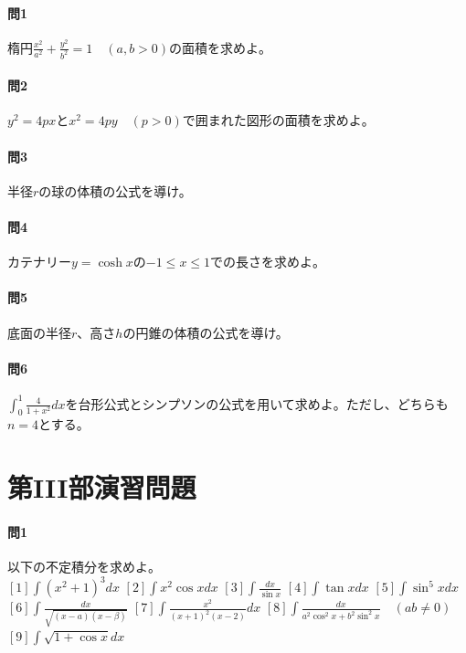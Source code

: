 \documentclass[a4j,dvipdfmx]{jsarticle}
\begin{document}
                \paragraph{問1}楕円$\displaystyle\frac{x^2}{a^2}+\frac{y^2}{b^2}=1\quad (a,b>0)$の面積を求めよ。

                \paragraph{問2}$y^2=4px$と$x^2=4py\quad (p>0)$で囲まれた図形の面積を求めよ。

                \paragraph{問3}半径$r$の球の体積の公式を導け。

                \paragraph{問4}カテナリー$y=\cosh x$の$-1\leq x\leq 1$での長さを求めよ。

                \paragraph{問5}底面の半径$r$、高さ$h$の円錐の体積の公式を導け。

                \paragraph{問6}$\displaystyle \int _0^1 \frac{4}{1+x^2}dx$を台形公式とシンプソンの公式を用いて求めよ。ただし、どちらも$n=4$とする。
            \clearpage
            \section{第III部演習問題}
            \paragraph{問1}以下の不定積分を求めよ。\\
                $\displaystyle [1]\int (x^2+1)^3dx$\hspace{3mm}
                $\displaystyle [2]\int x^2\cos xdx$\hspace{3mm}
                $\displaystyle [3]\int \frac{dx}{\sin x}$\hspace{3mm}
                $\displaystyle [4]\int \tan xdx$\hspace{3mm}
                $\displaystyle [5]\int \sin^5 xdx$
                $\displaystyle [6]\int \frac{dx}{\sqrt{(x-a)(x-\beta)}}$\hspace{3mm}
                $\displaystyle [7]\int \frac{x^2}{(x+1)^2(x-2)}dx$\hspace{3mm}
                $\displaystyle [8]\int\frac{dx}{a^2\cos^2 x+b^2\sin^2 x}\quad(ab\neq 0)$ \hspace{5mm}
                $\displaystyle [9]\int \sqrt{1+\cos x}dx$
            
\end{document}

